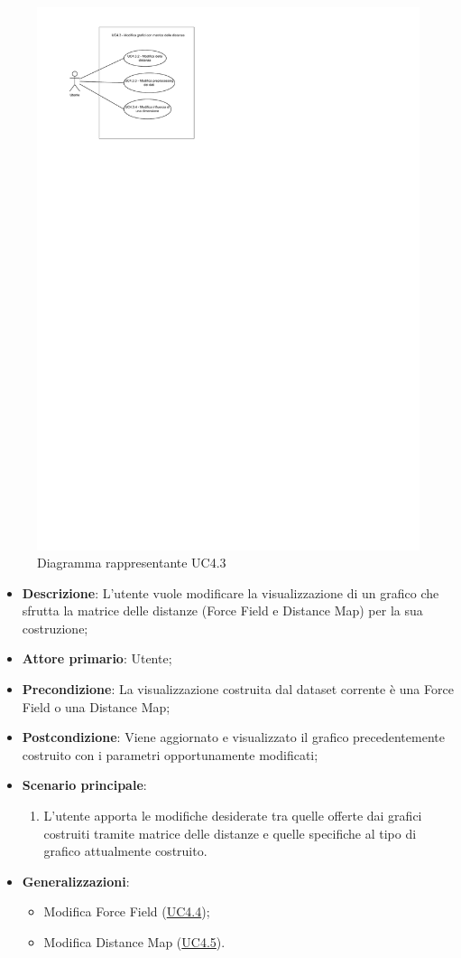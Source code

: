\begin{figure}[h]
    \centering
    \includegraphics[width=0.8  \textwidth]{componenti/casi-duso/diagrammi/UC4_3.pdf}
    \caption{Diagramma rappresentante UC4.3}
    \label{fig:UC4.3}
\end{figure}

\begin{itemize}
    \item \textbf{Descrizione}: L’utente vuole modificare la visualizzazione di un grafico che sfrutta la matrice delle 
    distanze (Force Field e Distance Map) per la sua costruzione;
    \item \textbf{Attore primario}: Utente;
    \item \textbf{Precondizione}: La visualizzazione costruita dal dataset corrente è una Force Field o una Distance Map;
    \item \textbf{Postcondizione}: Viene aggiornato e visualizzato il grafico precedentemente costruito con i parametri opportunamente modificati;
    \item \textbf{Scenario principale}:
    \begin{enumerate}
        \item L’utente apporta le modifiche desiderate tra quelle offerte dai grafici costruiti tramite matrice delle 
        distanze e quelle specifiche al tipo di grafico attualmente costruito.
    \end{enumerate}
    \item \textbf{Generalizzazioni}:
    \begin{itemize}
        \item Modifica Force Field (\hyperref[ssub:uc4.4]{UC4.4});
        \item Modifica Distance Map (\hyperref[ssub:uc4.5]{UC4.5}).
    \end{itemize}
\end{itemize}

